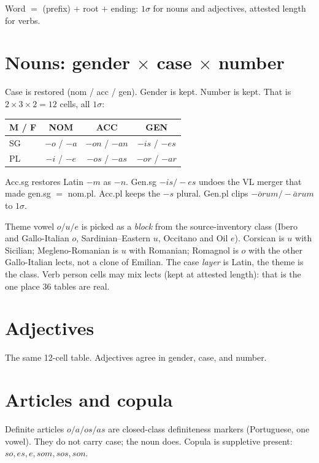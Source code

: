 \documentclass[12pt]{book}
\begin{document}
Word $=$ (prefix) $+$ root $+$ ending: $1\sigma$ for nouns and
adjectives, attested length for verbs.

\section{Nouns: gender $\times$ case $\times$ number}

Case is restored (nom / acc / gen). Gender is kept. Number is kept.
That is $2\times 3\times 2 = 12$ cells, all $1\sigma$:

\begin{center}
\begin{tabular}{@{}lccc@{}}
\toprule
M / F & NOM & ACC & GEN \\
\midrule
SG & $-o$ / $-a$ & $-on$ / $-an$ & $-is$ / $-es$ \\
PL & $-i$ / $-e$  & $-os$ / $-as$ & $-or$ / $-ar$ \\
\bottomrule
\end{tabular}
\end{center}

Acc.sg restores Latin $-m$ as $-n$. Gen.sg $-is/-es$ undoes the VL
merger that made gen.sg $=$ nom.pl. Acc.pl keeps the $-s$ plural.
Gen.pl clips $-\bar{o}rum / -\bar{a}rum$ to $1\sigma$.

Theme vowel $o/u/e$ is picked as a \emph{block} from the source-inventory
class (Ibero and Gallo-Italian $o$, Sardinian--Eastern $u$, Occitano and
Oil $e$). Corsican is $u$ with Sicilian; Megleno-Romanian is $u$ with
Romanian; Romagnol is $o$ with the other Gallo-Italian lects, not a
clone of Emilian. The case \emph{layer} is Latin, the theme is the
class. Verb person cells may mix lects (kept at attested length): that is
the one place 36 tables are real.

\section{Adjectives}

The same 12-cell table. Adjectives agree in gender, case, and number.

\section{Articles and copula}

Definite articles $o/a/os/as$ are closed-class definiteness markers
(Portuguese, one vowel). They do not carry case; the noun does.
Copula is suppletive present: $so, es, e, som, sos, son$.
\end{document}

